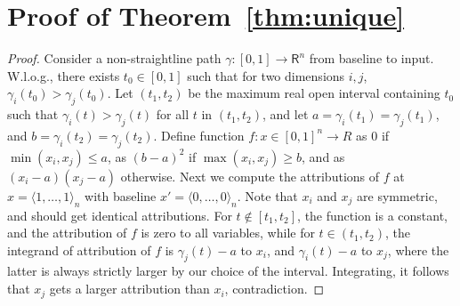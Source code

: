 \documentclass{article}
\newcommand{\esm}[1]{\ensuremath{#1}}
\newcommand{\ms}[1]{\esm{\mathsf{#1}}}
\newcommand\reals{\ms{R}} \newcommand\incp{\ms{Incp}}
\newcommand\pathfn{\gamma}
\newcommand\xbase{x'}
\begin{document}
\section{Proof of Theorem~\ref{thm:unique}}\label{sec:proof}
\begin{proof}
  Consider a non-straightline path $\pathfn:[0,1]\to \reals^n$ from baseline
  to input.  W.l.o.g.,
there exists $t_0\in [0,1]$ such that for two dimensions $i,j$,
$\pathfn_i(t_0) > \pathfn_j(t_0)$.  Let $(t_1, t_2)$ be the maximum real
open interval containing $t_0$ such that $\pathfn_i(t) > \pathfn_j(t)$
for all $t$ in $(t_1, t_2)$, and let $a=\pathfn_i(t_1)=\pathfn_j(t_1)$,
and $b=\pathfn_i(t_2)=\pathfn_j(t_2)$.  Define function $f:x\in
[0,1]^n\to R$ as $0$ if $\min(x_i, x_j) \leq a$, as $(b - a)^2$ if
$\max(x_i,x_j)\geq b$, and as $(x_i - a)(x_j-a)$ otherwise.  Next we
compute the attributions of $f$ at $x=\langle 1,\ldots,1\rangle_n$ with
baseline $\xbase=\langle 0,\ldots,0\rangle_n$.
Note that $x_i$ and $x_j$ are symmetric, and should get identical
attributions.  For $t\notin [t_1, t_2]$, the function is a constant,
and the attribution of $f$ is zero to all variables, while for
$t\in(t_1, t_2)$, the integrand of attribution of $f$ is $\pathfn_j(t) - a$ to
$x_i$, and $\pathfn_i(t) - a$ to $x_j$, where the latter is always
strictly larger by our choice of the interval. Integrating, 
it follows that $x_j$ gets a larger attribution than $x_i$, contradiction.
\end{proof}
\end{document}
